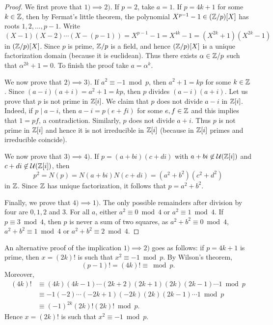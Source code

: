 \begin{proof}
    We first prove that $1)\implies 2)$. If $p=2$, take $a=1$. If $p=4k+1$ for some $k\in\mathbb{Z}$, then
    by Fermat's little theorem, the polynomial 
    $X^{p-1}-1\in(\mathbb{Z}/p)[X]$ has roots $1,2,\dots,p-1$. Write
    \[
    (X-1)(X-2)\cdots (X-(p-1))=X^{p-1}-1=X^{4k}-1=(X^{2k}+1)(X^{2k}-1)
    \]
    in $(\mathbb{Z}/p)[X]$. Since $p$ is prime, $\mathbb{Z}/p$ is a field, and hence 
    $(\mathbb{Z}/p)[X]$ is a unique factorization domain (because it is euclidean). Thus 
    there exists $\alpha\in\mathbb{Z}/p$ such that $\alpha^{2k}+1=0$. To finish the proof
    take $a=\alpha^k$. 
    
    We now prove that $2)\implies 3)$. If $a^2\equiv-1\bmod p$, then $a^2+1=kp$ 
    for some $k\in\mathbb{Z}$. Since $(a-i)(a+i)=a^2+1=kp$, then $p$ divides $(a-i)(a+i)$. Let us prove that $p$ is not prime in $\mathbb{Z}[i]$. 
    We claim that $p$ does not divide $a-i$ in $\mathbb{Z}[i]$. Indeed, if $p\mid a-i$, then
    $a-i=p(e+fi)$ for some $e,f\in\mathbb{Z}$ and this implies that $1=pf$, a contradiction. Similarly,
    $p$ does not divide $a+i$. Thus $p$ is not prime in $\mathbb{Z}[i]$ 
    and hence it is not irreducible in $\mathbb{Z}[i]$ (because in $\mathbb{Z}[i]$ primes and irreducible coincide). 
    
    We now prove that $3)\implies 4)$. If $p=(a+bi)(c+di)$ with $a+bi\not\in\mathcal{U}(\mathbb{Z}[i])$
    and  $c+di\not\in\mathcal{U}(\mathbb{Z}[i])$, then
    \[
    p^2=N(p)=N(a+bi)N(c+di)=(a^2+b^2)(c^2+d^2)
    \]
    in $\mathbb{Z}$. Since $\mathbb{Z}$ has unique factorization, it follows that $p=a^2+b^2$. 
    
    Finally, we prove that $4)\implies 1)$. 
    The only possible remainders after division by four are $0,1,2$ and $3$.  
    For all $a$, either $a^2\equiv 0\bmod 4$ or $a^2\equiv 1\bmod 4$. 
    If $p\equiv3\bmod 4$, then $p$ is never a sum of two squares, as 
    $a^2+b^2\equiv 0\bmod 4$, $a^2+b^2\equiv 1\bmod 4$ or $a^2+b^2\equiv 2\bmod 4$. 
\end{proof}

An alternative proof of the implication 
$1)\implies 2)$ goes as follows: if $p=4k+1$ is prime, then 
$x=(2k)!$ is such that $x^2\equiv -1\bmod p$. By Wilson's theorem, 
\[
(p-1)! = (4k)!\equiv \bmod p.
\]
Moreover,  
\begin{align*}
(4k)!&\equiv(4k)(4k-1)\cdots(2k+2)(2k+1)(2k)(2k-1)\cdots1\bmod p\\
&\equiv-1(-2)\cdots(-2k+1)(-2k)(2k)(2k-1)\cdots1\bmod p\\
&\equiv(-1)^{2k}(2k)!(2k)!\bmod p.
\end{align*}
Hence $x=(2k)!$ is such that $x^2\equiv -1\bmod p$.

